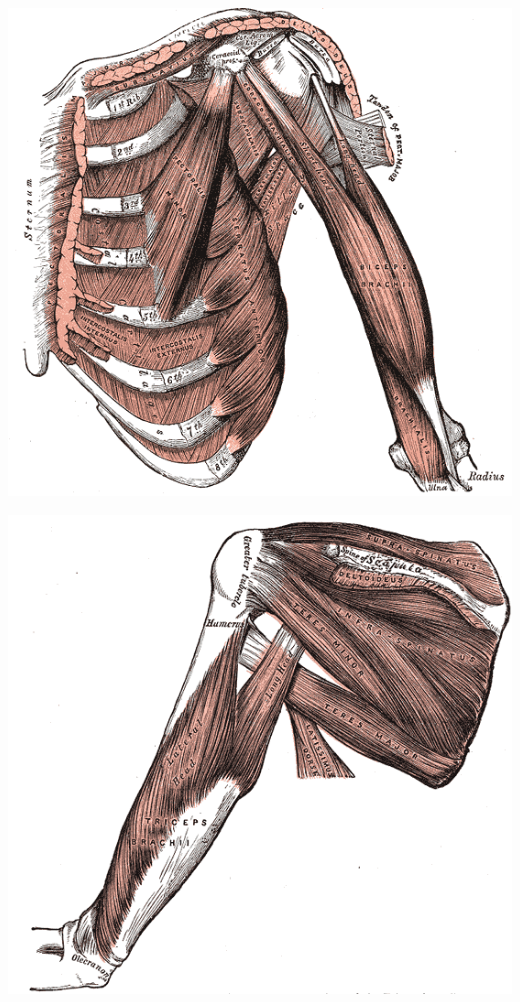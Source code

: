 \documentclass[pdftex,a4paper,11pt]{report}
\numberwithin{equation}{subsection}
\begin{document}
\begin{center}
        \includegraphics[width=.80\linewidth]{fig/Gray411}
\end{center}

\begin{center}
        \includegraphics[width=.80\linewidth]{fig/Gray412}
\end{center}
\end{document}
